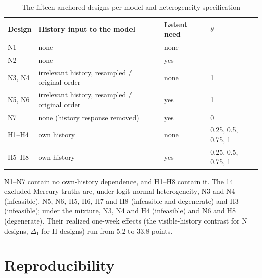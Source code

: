 \documentclass[11pt]{article}
\begin{document}
\begin{table}[h]
\centering\small
\caption{The fifteen anchored designs per model and heterogeneity specification}
\label{tab:truths}
\begin{tabular}{llll}
\toprule
Design & History input to the model & Latent need & $\theta$ \\
\midrule
N1 & none & none & --- \\
N2 & none & yes & --- \\
N3, N4 & irrelevant history, resampled / original order & none & 1 \\
N5, N6 & irrelevant history, resampled / original order & yes & 1 \\
N7 & none (history response removed) & yes & 0 \\
H1--H4 & own history & none & 0.25, 0.5, 0.75, 1 \\
H5--H8 & own history & yes & 0.25, 0.5, 0.75, 1 \\
\bottomrule
\end{tabular}

\smallskip
\parbox{0.94\textwidth}{\footnotesize N1--N7 contain no own-history dependence, and H1--H8 contain it. The 14
excluded Mercury truths are, under logit-normal heterogeneity, N3 and N4 (infeasible), N5, N6, H5, H6, H7
and H8 (infeasible and degenerate) and H3 (infeasible); under the mixture, N3, N4 and H4 (infeasible) and
N6 and H8 (degenerate). Their realized one-week effects (the visible-history contrast for N
designs, $\Delta_1$ for H designs) run from 5.2 to 33.8 points.}
\end{table}

\FloatBarrier
\section{Reproducibility}
\label{app:repro}
\end{document}
